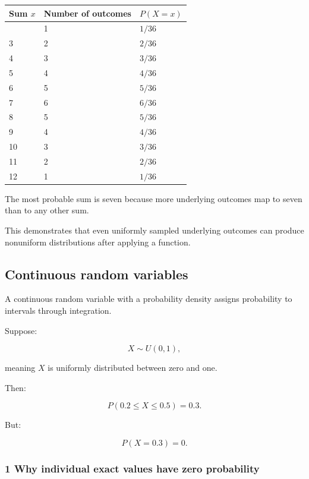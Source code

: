 {\def\LTcaptype{none} %
\begin{longtable}[]{@{}lll@{}}
\toprule\noalign{}
Sum \(x\) & Number of outcomes & \(P(X=x)\) \\
\midrule\noalign{}
\endhead
\bottomrule\noalign{}
\endlastfoot
2 & 1 & \(1/36\) \\
3 & 2 & \(2/36\) \\
4 & 3 & \(3/36\) \\
5 & 4 & \(4/36\) \\
6 & 5 & \(5/36\) \\
7 & 6 & \(6/36\) \\
8 & 5 & \(5/36\) \\
9 & 4 & \(4/36\) \\
10 & 3 & \(3/36\) \\
11 & 2 & \(2/36\) \\
12 & 1 & \(1/36\) \\
\end{longtable}
}

The most probable sum is seven because more underlying outcomes map to seven than to any other sum.

This demonstrates that even uniformly sampled underlying outcomes can produce nonuniform distributions after applying a function.

\subsection{Continuous random variables}\label{02-foundations-ii-ch023-continuous-random-variables}

\hypertarget{02-foundations-ii-ch023-continuous-random-variables}{}

A continuous random variable with a probability density assigns probability to intervals through integration.

Suppose:

\[
 X\sim U(0,1),
\]

meaning \(X\) is uniformly distributed between zero and one.

Then:

\[
 P(0.2\le X\le0.5)=0.3.
\]

But:

\[
 P(X=0.3)=0.
\]

\subsubsection{1 Why individual exact values have zero probability}\label{02-foundations-ii-ch023-why-individual-exact-values-have-zero-probability}

